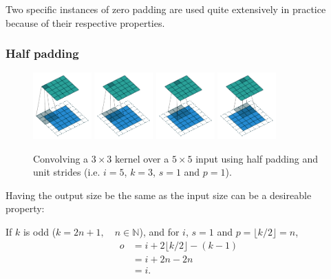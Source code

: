 \documentclass{article}
\begin{document}
Two specific instances of zero padding are used quite extensively in practice
because of their respective properties.

\subsubsection{Half padding}

\begin{figure}[h]
    \centering
    \includegraphics[width=0.2\textwidth]{pdf/same_padding_no_strides_00.pdf}
    \includegraphics[width=0.2\textwidth]{pdf/same_padding_no_strides_01.pdf}
    \includegraphics[width=0.2\textwidth]{pdf/same_padding_no_strides_02.pdf}
    \includegraphics[width=0.2\textwidth]{pdf/same_padding_no_strides_03.pdf}
    \caption{\label{fig:same_padding_no_strides} Convolving a $3 \times 3$
        kernel over a $5 \times 5$ input using half padding and unit strides
        (i.e. $i = 5$, $k = 3$, $s = 1$ and $p = 1$).}
\end{figure}

Having the output size be the same as the input size can be a desireable
property:

\begin{prop}\label{prop:same_padding_no_strides}
If $k$ is odd ($k = 2n + 1, \quad n \in \mathbb{N}$), and for $i$, $s = 1$ and
$p = \lfloor k / 2 \rfloor = n$,
\begin{equation*}
\begin{split}
    o &= i + 2 \lfloor k / 2 \rfloor - (k - 1) \\
      &= i + 2n - 2n \\
      &= i.
\end{split}
\end{equation*}
\end{prop}
\end{document}
